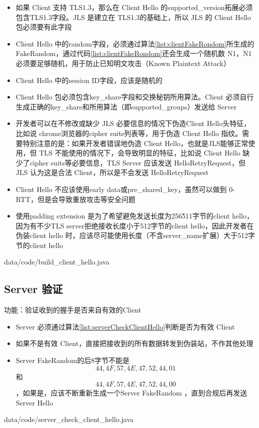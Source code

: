 \begin{itemize}
	\item 如果 Client 支持 TLS1.3，那么在 Client Hello 的supported\_version拓展必须包含TLS1.3字段。JLS 是建立在 TLS1.3的基础上，所以 JLS 的 Client Hello 包必须要有此字段

	\item Client Hello 中的random字段，必须通过算法\ref{list:clientFakeRondom}所生成的FakeRandom，通过代码\ref{list:clientFakeRondom}还会生成一个随机数 N1，N1 必须要足够随机，用于防止已知明文攻击（Known Plaintext Attack）

	\item Client Hello 中的session ID字段，应该是随机的

	\item Client Hello 包必须包含key\_share字段和交换秘钥所用算法。Client 必须自行生成正确的key\_share和所用算法（即supported\_groups）发送给 Server

	\item 开发者可以在不修改或缺少 JLS 必要信息的情况下伪造Client Hello头特征，比如说 chrome浏览器的cipher suits列表等，用于伪造 Client Hello 指纹。需要特别注意的是：如果开发者错误地伪造 Client Hello，也就是JLS能够正常使用，但 TLS 不能使用的情况下，会导致明显的特征，比如说 Client Hello 缺少了cipher suits等必要信息，TLS Server 应该发送 HelloRetryRequest，但JLS 认为这是合法 Client，所以是不会发送 HelloRetryRequest

	\item Client Hello 不应该使用early data或pre\_shared\_key，虽然可以做到 0-RTT，但是会导致重放攻击等安全问题

	\item 使用padding extension 是为了希望避免发送长度为256\~511字节的client hello\cite{langley2015rfc}，因为有不少TLS server拒绝接收长度小于512字节的client hello，因此开发者在伪装client hello 时，应该尽可能使用长度（不含server\_name扩展）大于512字节的client hello
\end{itemize}

 {data/code/build_client_hello.java}


\subsection{Server 验证}
功能：验证收到的握手是否来自有效的Client
\begin{itemize}
	\item Server 必须通过算法\ref{list:serverCheckClientHello}判断是否为有效 Client

	\item 如果不是有效 Client，直接把接收到的所有数据转发到伪装站，不作其他处理

	\item Server FakeRandom的后8字节不能是\[ 44,4F,57,4E,47,52,44,01 \]和\[ 44,4F,57,4E,47,52,44,00 \]，如果是，应该不断重新生成一个Server FakeRandom ，直到合规后再发送 Server Hello

\end{itemize}
 {data/code/server_check_client_hello.java}

